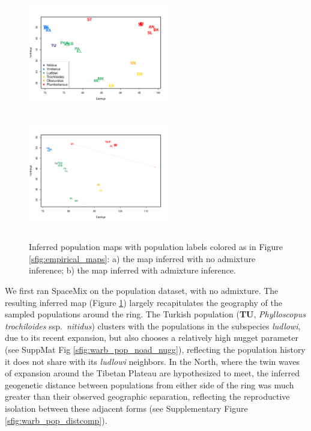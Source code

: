 \documentclass[12pt]{article}
\begin{document}
\begin{figure}
	\centering
			{\includegraphics[width=2.4in,height=2in]{figs/warblers/warb_pop_noad.pdf}}
			{\includegraphics[width=2.4in,height=2in]{figs/warblers/population_warbler_map_randpr1.pdf}}
\caption{Inferred population maps with population labels colored as in Figure  \ref{sfig:empirical_maps}: a) the map inferred with no admixture inference; b) the map inferred with admixture inference.}
\label{sfig:warbler_pop}
\end{figure}

We first ran SpaceMix on the population dataset, with no admixture. The resulting inferred map (Figure \ref{sfig:warbler_pop}) largely recapitulates the geography of the sampled populations around the ring.  The Turkish population (\textbf{TU}, \textit{Phylloscopus trochiloides} ssp.\ \textit{nitidus}) clusters with the populations in the subspecies \textit{ludlowi}, due to its recent expansion, but also chooses a relatively high nugget parameter (see SuppMat Fig \ref{sfig:warb_pop_noad_nugg}), reflecting the population history it does not share with its \textit{ludlowi} neighbors.  In the North, where the twin waves of expansion around the Tibetan Plateau are hypothesized to meet, the inferred geogenetic distance between populations from either side of the ring was much greater than their observed geographic separation, reflecting the reproductive isolation between these adjacent forms (see Supplementary Figure \ref{sfig:warb_pop_distcomp}).  
\end{document}
